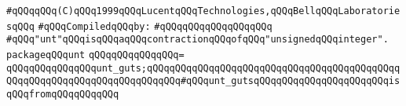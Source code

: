 \label{src/lib/std/unt.pkg}
\verb|#qQQqqQQq(C)qQQq1999qQQqLucentqQQqTechnologies,qQQqBellqQQqLaboratoriesqQQq|\newline
\newline
\verb|#qQQqCompiledqQQqby:|\newline
\verb|#qQQqqQQqqQQqqQQqqQQq|\newline
\newline
\verb|#qQQq"unt"qQQqisqQQqaqQQqcontractionqQQqofqQQq"unsignedqQQqinteger".|\newline
\newline
\verb|packageqQQqunt|\newline
\verb|qQQqqQQqqQQqqQQq=|\newline
\verb|qQQqqQQqqQQqqQQqunt_guts;qQQqqQQqqQQqqQQqqQQqqQQqqQQqqQQqqQQqqQQqqQQqqQQqqQQqqQQqqQQqqQQqqQQqqQQqqQQq#qQQqunt_gutsqQQqqQQqqQQqqQQqqQQqqQQqisqQQqfromqQQqqQQqqQQq|\newline
\newline

